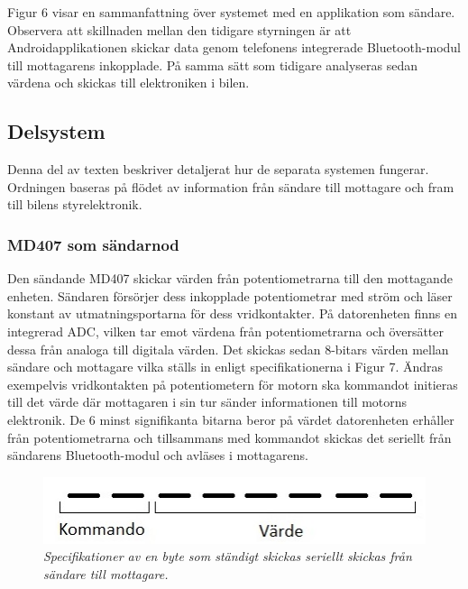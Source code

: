 \documentclass[a4paper]{article}
\begin{document}
Figur 6 visar en sammanfattning över systemet med en applikation som sändare. Observera att skillnaden mellan den tidigare styrningen är att Androidapplikationen skickar data genom telefonens integrerade Bluetooth-modul till mottagarens inkopplade. På samma sätt som tidigare analyseras sedan värdena och skickas till elektroniken i bilen.


\subsection{Delsystem}
Denna del av texten beskriver detaljerat hur de separata systemen fungerar. Ordningen baseras på flödet av information från sändare till mottagare och fram till bilens styrelektronik.




\subsubsection{MD407 som sändarnod}
Den sändande MD407 skickar värden från potentiometrarna till den mottagande enheten. Sändaren försörjer dess inkopplade potentiometrar med ström och läser konstant av utmatningsportarna för dess vridkontakter. På datorenheten finns en integrerad ADC, vilken tar emot värdena från potentiometrarna och översätter dessa från analoga till digitala värden. Det skickas sedan 8-bitars värden mellan sändare och mottagare vilka ställs in enligt specifikationerna i Figur 7. Ändras exempelvis vridkontakten på potentiometern för motorn ska kommandot initieras till det värde där mottagaren i sin tur sänder informationen till motorns elektronik. De 6 minst signifikanta bitarna beror på värdet datorenheten erhåller från potentiometrarna och tillsammans med kommandot skickas det seriellt från sändarens Bluetooth-modul och avläses i mottagarens.


\begin{figure}[H]
\includegraphics[scale=1]{aByteComVal.jpg}
\centering
\caption{\it Specifikationer av en byte som ständigt skickas seriellt skickas från sändare till mottagare.}
\end{figure} 
\end{document}
